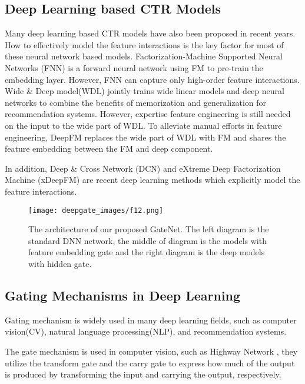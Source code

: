 \documentclass[sigconf,nonacm=true]{acmart}
\begin{document}
\subsection{Deep Learning based CTR Models}
Many deep learning based CTR models have also been proposed in recent years\cite{zhang2016deep,cheng2016wide,guo2017deepfm,lian2018xdeepfm,wang2017deep}. How to effectively model the feature interactions is the key factor for most of these neural network based models. Factorization-Machine Supported Neural Networks (FNN)\cite{zhang2016deep} is a forward neural network using FM to pre-train the embedding layer.
However, FNN can capture only high-order feature interactions. Wide \& Deep model(WDL)\cite{cheng2016wide} jointly trains wide linear models and deep neural networks to combine the benefits of memorization and generalization for recommendation systems. 
However, expertise feature engineering is still needed on the input to the wide part of WDL. 
To alleviate manual efforts in feature engineering, DeepFM\cite{guo2017deepfm} replaces the wide part of WDL with FM and shares the
feature embedding between the FM and deep component.

In addition, Deep \& Cross Network (DCN)\cite{wang2017deep} and eXtreme Deep Factorization Machine (xDeepFM)\cite{lian2018xdeepfm} are recent deep learning methods which explicitly model the feature interactions.


\begin{figure*}[hbt!]
\centering
\texttt{[image: deepgate\_images/f12.png]}

\caption{The architecture of our proposed GateNet. The left diagram is the standard DNN network, the middle of diagram is the models with feature embedding gate and the right diagram is the deep models with hidden gate.}
\label{fig:f1}
\end{figure*}

\subsection{Gating Mechanisms in Deep Learning}
Gating mechanism is widely used in many deep learning fields, such as computer vision(CV), natural language processing(NLP), and recommendation systems.

The gate mechanism is used in computer vision, such as Highway Network \cite{srivastava2015highway}, they utilize the transform gate and the carry gate to express how much of the output is produced by
transforming the input and carrying the output, respectively.
\end{document}
